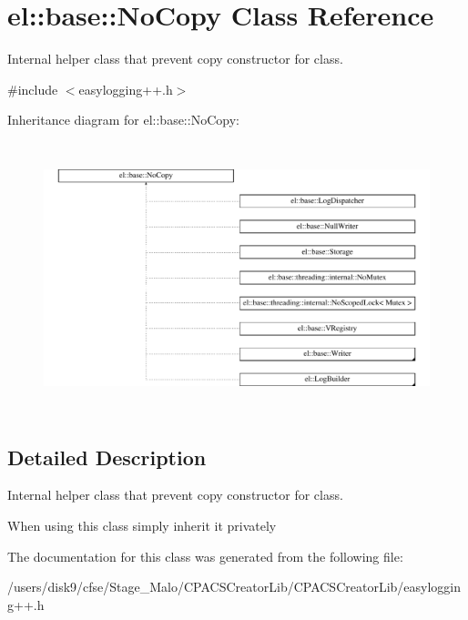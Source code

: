 \hypertarget{classel_1_1base_1_1NoCopy}{\section{el\-:\-:base\-:\-:No\-Copy Class Reference}
\label{classel_1_1base_1_1NoCopy}
}


Internal helper class that prevent copy constructor for class.  




{\ttfamily \#include $<$easylogging++.\-h$>$}

Inheritance diagram for el\-:\-:base\-:\-:No\-Copy\-:\begin{figure}[H]
\begin{center}
\leavevmode
\includegraphics[height=7.875000cm]{classel_1_1base_1_1NoCopy}
\end{center}
\end{figure}


\subsection{Detailed Description}
Internal helper class that prevent copy constructor for class. 

When using this class simply inherit it privately 

The documentation for this class was generated from the following file\-:\begin{DoxyCompactItemize}
\item 
/users/disk9/cfse/\-Stage\-\_\-\-Malo/\-C\-P\-A\-C\-S\-Creator\-Lib/\-C\-P\-A\-C\-S\-Creator\-Lib/easylogging++.\-h\end{DoxyCompactItemize}
